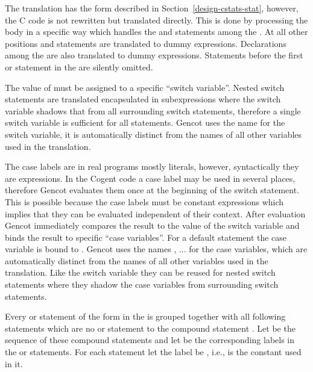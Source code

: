 The translation has the form described in Section~\ref{design-cstats-stat}, however, the C code is not rewritten but translated
directly. This is done by processing the body  in a specific way which handles the  and 
statements among the . At all other positions  and  statements are translated to dummy expressions.
Declarations among the  are also translated to dummy expressions. Statements before the first  or 
statement in the  are silently omitted.

The value of  must be assigned to a specific ``switch variable''. Nested switch statements are translated encapsulated 
in subexpressions where the switch variable shadows that from all surrounding switch statements, therefore a single switch variable 
is sufficient for all statements. Gencot uses the name  for the switch variable, it is automatically distinct from the names of
all other variables used in the translation. 

The case labels are in real programs mostly literals, however, syntactically they are 
expressions. In the Cogent code a case label may be used in several places, therefore Gencot evaluates them once at the beginning 
of the switch statement. This is possible because the case labels must be constant 
expressions which implies that they can be evaluated independent of their context. After evaluation Gencot immediately compares the result
to the value of the switch variable and binds the result to specific ``case variables''. For a default statement the case variable is
bound to . Gencot uses the names , ... for the 
case variables, which are automatically distinct from the names of all other variables used in the translation. Like the switch variable
they can be reused for nested switch statements where they shadow the case variables from surrounding switch statements.

Every  or  statement  of the form  in the  is grouped together with all 
following statements  which are no  or  statement to the compound statement .
Let  be the sequence of these compound statements and let  be the corresponding labels in the 
or  statements. For each  statement let the label  be , i.e.,  is the constant
used in it.

